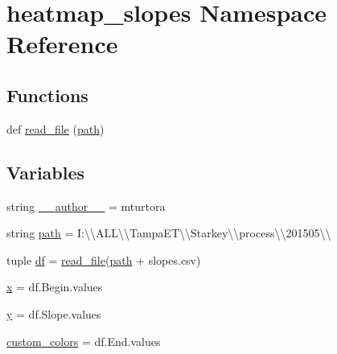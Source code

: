 \hypertarget{namespaceheatmap__slopes}{}\section{heatmap\+\_\+slopes Namespace Reference}
\label{namespaceheatmap__slopes}
\subsection*{Functions}
\begin{DoxyCompactItemize}
\item 
def \hyperlink{namespaceheatmap__slopes_a33c45e5d0e9e92c296e18f8ca66b5638}{read\+\_\+file} (\hyperlink{namespaceheatmap__slopes_ad5603c14f73e42c82621c93fe6d44b26}{path})
\end{DoxyCompactItemize}
\subsection*{Variables}
\begin{DoxyCompactItemize}
\item 
string \hyperlink{namespaceheatmap__slopes_ab7a46011bf1690c1bbf4d0d9b90ff55a}{\+\_\+\+\_\+author\+\_\+\+\_\+} = \textquotesingle{}mturtora\textquotesingle{}
\item 
string \hyperlink{namespaceheatmap__slopes_ad5603c14f73e42c82621c93fe6d44b26}{path} = \textquotesingle{}I\+:\textbackslash{}\textbackslash{}\+A\+L\+L\textbackslash{}\textbackslash{}\+Tampa\+E\+T\textbackslash{}\textbackslash{}\+Starkey\textbackslash{}\textbackslash{}process\textbackslash{}\textbackslash{}201505\textbackslash{}\textbackslash{}\textquotesingle{}
\item 
tuple \hyperlink{namespaceheatmap__slopes_ac3ee4dd583b7c5cd73fbdc02298c4dcb}{df} = \hyperlink{namespaceheatmap__slopes_a33c45e5d0e9e92c296e18f8ca66b5638}{read\+\_\+file}(\hyperlink{namespaceheatmap__slopes_ad5603c14f73e42c82621c93fe6d44b26}{path} + \textquotesingle{}slopes.\+csv\textquotesingle{})
\item 
\hyperlink{namespaceheatmap__slopes_aa1c2bb69edf12eba2a35308bd4d5fc54}{x} = df.\+Begin.\+values
\item 
\hyperlink{namespaceheatmap__slopes_afe0805836a2ce30217aa9093142eee6e}{y} = df.\+Slope.\+values
\item 
\hyperlink{namespaceheatmap__slopes_abe09eedeaabe04604f446a88d9999f20}{custom\+\_\+colors} = df.\+End.\+values
\end{DoxyCompactItemize}


